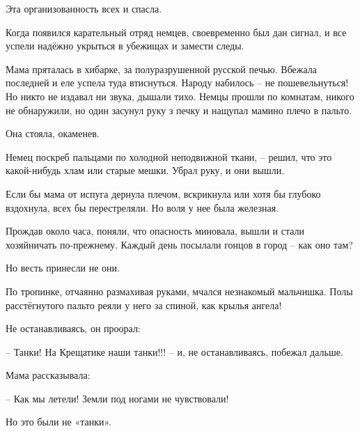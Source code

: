 Эта организованность всех и спасла.

Когда появился карательный отряд немцев, своевременно был дан сигнал, и все
успели надёжно укрыться в убежищах и замести следы.

Мама пряталась в хибарке, за полуразрушенной русской печью. Вбежала последней и
еле успела туда втиснуться. Народу набилось – не пошевельнуться! Но никто не
издавал ни звука, дышали тихо. Немцы прошли по комнатам, никого не обнаружили,
но один засунул руку з печку и нащупал мамино плечо в пальто.

\raggedcolumns
\begin{multicols}{3} %
\setlength{\parindent}{0pt}




\end{multicols} %

Она стояла, окаменев.

Немец поскреб пальцами по холодной неподвижной ткани, – решил, что это
какой-нибудь хлам или старые мешки. Убрал руку, и они вышли.

Если бы мама от испуга дернула плечом, вскрикнула или хотя бы глубоко
вздохнула, всех бы перестреляли. Но воля у нее была железная.

Прождав около часа, поняли, что опасность миновала, вышли и стали хозяйничать
по-прежнему. Каждый день посылали гонцов в город – как оно там?

Но весть принесли не они.

По тропинке, отчаянно размахивая руками, мчался незнакомый мальчишка. Полы
расстёгнутого пальто реяли у него за спиной, как крылья ангела!

Не останавливаясь, он проорал:

– Танки! На Крещатике наши танки!!! – и, не останавливаясь, побежал дальше.

Мама рассказывала:

– Как мы летели! Земли под ногами не чувствовали!

Но это были не «танки».

